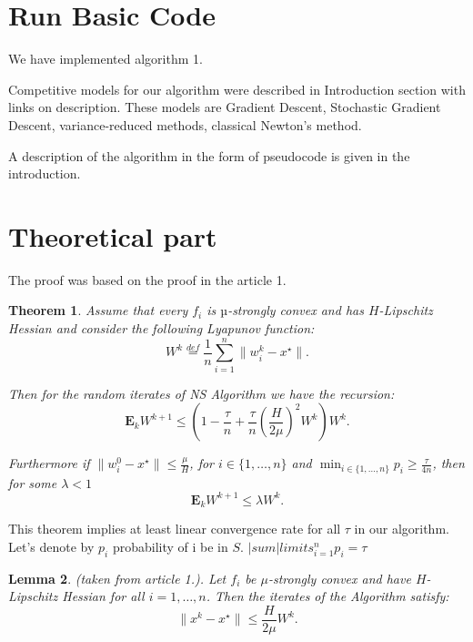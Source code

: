 \documentclass{article}
\newtheorem{theorem}{Theorem}
\newtheorem{lemma}[theorem]{Lemma}
\begin{document}
\section{Run Basic Code}
We have implemented algorithm 1. 

Competitive models for our algorithm were described in Introduction section with links on description. These models are  Gradient Descent, Stochastic Gradient Descent, variance-reduced methods, classical Newton's method.

A description of the algorithm in the form of pseudocode is given in the introduction.
\section{Theoretical part}

The proof was based on the proof in the article 1.

\begin{theorem} Assume that every $f_i$ is $µ$-strongly convex and has $H$-Lipschitz Hessian and consider
the following Lyapunov function:
\begin{equation}
    W^k \overset{def}{=} \frac{1}{n}\sum\limits_{i=1}^{n}\|w_i^k - x^\star\|.
\end{equation}

Then for the random iterates of NS Algorithm we have the recursion:
\begin{equation}
    \mathbf{E}_k W^{k + 1} \leq \left(1 - \frac{\tau}{n} +
    \frac{\tau}{n}\left(\frac{H}{2\mu}\right)^2W^k\right)W^k.
\end{equation}

Furthermore if $\|w_i^0 - x^\star\| \leq \frac{\mu}{H}$, for $i \in \{1, \dots, n\}$ and $\min_{i \in \{1, \dots, n\}}{p_i} \geq \frac{\tau}{4n}$, then for some $\lambda < 1$
\begin{equation}
    \mathbf{E}_k W^{k + 1} \leq \lambda W^k.
\end{equation}
\end{theorem}

This theorem implies at least linear convergence rate for all $\tau$ in our algorithm.
Let's denote by $p_i$ probability of i be in $S$. $|sum|limits_{i=1}^n p_i = \tau$

\begin{lemma} (taken from article 1.).
Let $f_i$ be $\mu$-strongly convex and have $H$-Lipschitz Hessian for all $i = 1, \dots, n$. Then
the iterates of the Algorithm satisfy:
\begin{equation}
    \|x^k - x^\star\| \leq \frac{H}{2\mu}W^k.
\end{equation}
\end{lemma}
\end{document}
